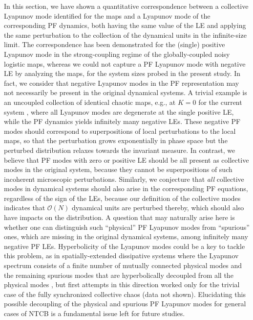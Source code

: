 \documentclass[12pt]{iopart}
\begin{document}
In this section, we have shown a quantitative correspondence
 between a collective Lyapunov mode identified for the maps
 and a Lyapunov mode of the corresponding PF dynamics,
 both having the same value of the LE and applying the same perturbation
 to the collection of the dynamical units in the infinite-size limit.
The correspondence has been demonstrated
 for the (single) positive Lyapunov mode in the strong-coupling regime
 of the globally-coupled noisy logistic maps,
 whereas we could not capture a PF Lyapunov mode with negative LE
 by analyzing the maps,
 for the system sizes probed in the present study.
In fact, we consider that negative Lyapunov modes in the PF representation
 may not necessarily be present in the original dynamical systems.
A trivial example is an uncoupled collection of identical chaotic maps,
 e.g., at $K=0$ for the current system ,
 where all Lyapunov modes are degenerate at the single positive LE,
 while the PF dynamics yields infinitely many negative LEs.
These negative PF modes should correspond to
 superpositions of local perturbations to the local maps,
 so that the perturbation grows exponentially in phase space
 but the perturbed distribution relaxes towards the invariant measure.
In contrast, we believe that PF modes with zero or positive LE
 should be all present as collective modes in the original system,
 because they cannot be superpositions
 of such incoherent microscopic perturbations.
Similarly, we conjecture that \textit{all} collective modes
 in dynamical systems should also arise in the corresponding PF equations,
 regardless of the sign of the LEs,
 because our definition of the collective modes indicates that
 $\mathcal{O}(N)$ dynamical units are perturbed thereby,
 which should also have impacts on the distribution.
A question that may naturally arise here
 is whether one can distinguish such ``physical'' PF Lyapunov modes
 from ``spurious'' ones,
 which are missing in the original dynamical systems,
 among infinitely many negative PF LEs.
Hyperbolicity of the Lyapunov modes could be a key to tackle this problem,
 as in spatially-extended dissipative systems where
 the Lyapunov spectrum consists of
 a finite number of mutually connected physical modes
 and the remaining spurious modes
 that are hyperbolically decoupled from all the physical modes
 \cite{Yang.etal-PRL2009,Takeuchi.etal-PRE2011},
 but first attempts in this direction worked only for the trivial case
 of the fully synchronized collective chaos (data not shown).
Elucidating this possible decoupling of the physical and spurious
 PF Lyapunov modes for general cases of NTCB
 is a fundamental issue left for future studies.
\end{document}
